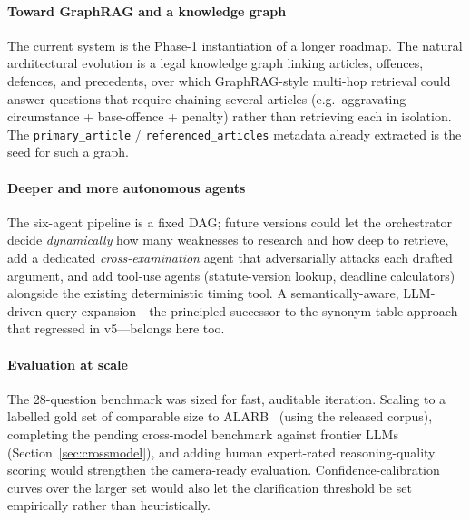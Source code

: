\documentclass[final,1p,times]{elsarticle}
\begin{document}
\paragraph{Toward GraphRAG and a knowledge graph} The current system is the
Phase-1 instantiation of a longer roadmap. The natural architectural evolution is
a legal knowledge graph linking articles, offences, defences, and precedents, over
which GraphRAG-style multi-hop retrieval could answer questions that require
chaining several articles (e.g.\ aggravating-circumstance + base-offence + penalty)
rather than retrieving each in isolation. The \texttt{primary\_article} /
\texttt{referenced\_articles} metadata already extracted is the seed for such a
graph.

\paragraph{Deeper and more autonomous agents} The six-agent pipeline is a fixed
DAG; future versions could let the orchestrator decide \emph{dynamically} how many
weaknesses to research and how deep to retrieve, add a dedicated
\emph{cross-examination} agent that adversarially attacks each drafted argument,
and add tool-use agents (statute-version lookup, deadline calculators) alongside
the existing deterministic timing tool. A semantically-aware, LLM-driven query
expansion---the principled successor to the synonym-table approach that regressed
in v5---belongs here too.

\paragraph{Evaluation at scale} The 28-question benchmark was sized for fast,
auditable iteration. Scaling to a labelled gold set of comparable size to
ALARB~\cite{alarb2025} (using the released corpus), completing the pending
cross-model benchmark against frontier LLMs (Section~\ref{sec:crossmodel}), and
adding human expert-rated reasoning-quality scoring would strengthen the
camera-ready evaluation. Confidence-calibration curves over the larger set would
also let the clarification threshold be set empirically rather than heuristically.
\end{document}
